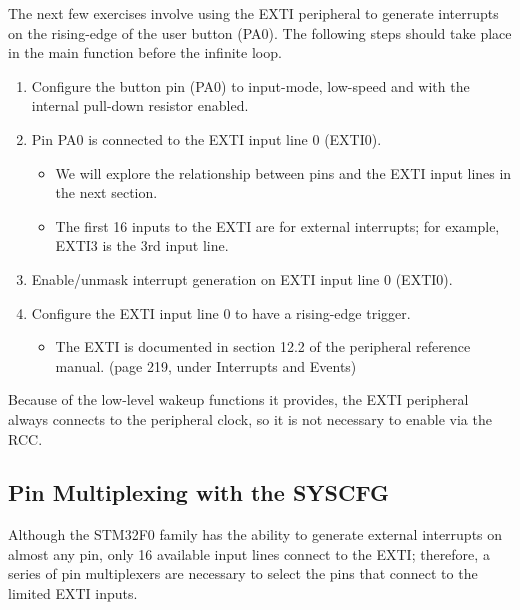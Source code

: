 \documentclass[11pt,fleqn]{book} %
\begin{document}
\begin{exercise}
    \label{ex2}
   The next few exercises involve using the EXTI peripheral to generate interrupts on the rising-edge of the user button (PA0). The following steps should take place in the main function before the infinite loop. 
    \begin{enumerate}
        \item Configure the button pin (PA0) to input-mode, low-speed and with the internal pull-down resistor enabled. 
        \item Pin PA0 is connected to the EXTI input line 0 (EXTI0). 
        \begin{itemize}
            \item We will explore the relationship between pins and the EXTI input lines in the next section. 
            \item The first 16 inputs to the EXTI are for external interrupts; for example, EXTI3 is the 3rd input line.
        \end{itemize}
        \item Enable/unmask interrupt generation on EXTI input line 0 (EXTI0).
        \item Configure the EXTI input line 0 to have a rising-edge trigger.
        \begin{itemize}
            \item The EXTI is documented in section 12.2 of the peripheral reference manual. (page 219, under Interrupts and Events)
        \end{itemize}
    \end{enumerate}

    \noindent Because of the low-level wakeup functions it provides, the EXTI peripheral always connects to the peripheral clock, so it is not necessary to enable via the RCC.   
\end{exercise}



\subsection{Pin Multiplexing with the SYSCFG} \label{syscfg}
Although the STM32F0 family has the ability to generate external interrupts on almost any pin, only 16 available input lines connect to the EXTI; therefore, a series of pin multiplexers are necessary to select the pins that connect to the limited EXTI inputs.  
\end{document}
